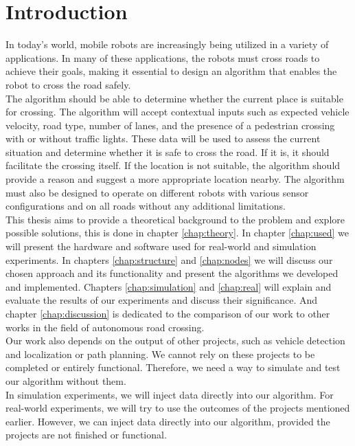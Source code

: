 \chapter*{Introduction}
    In today's world, mobile robots are increasingly being utilized in a variety of applications. In many of these applications, the robots must cross roads to achieve their goals, making it essential to design an algorithm that enables the robot to cross the road safely.\\
    The algorithm should be able to determine whether the current place is suitable for crossing. The algorithm will accept contextual inputs such as expected vehicle velocity, road type, number of lanes, and the presence of a pedestrian crossing with or without traffic lights. These data will be used to assess the current situation and determine whether it is safe to cross the road. If it is, it should facilitate the crossing itself. If the location is not suitable, the algorithm should provide a reason and suggest a more appropriate location nearby. The algorithm must also be designed to operate on different robots with various sensor configurations and on all roads without any additional limitations.\\
    This thesis aims to provide a theoretical background to the problem and explore possible solutions, this is done in chapter \ref{chap:theory}. In chapter \ref{chap:used} we will present the hardware and software used for real-world and simulation experiments. In chapters \ref{chap:structure} and \ref{chap:nodes} we will discuss our chosen approach and its functionality and present the algorithms we developed and implemented. Chapters \ref{chap:simulation} and \ref{chap:real} will explain and evaluate the results of our experiments and discuss their significance. And chapter \ref{chap:discussion} is dedicated to the comparison of our work to other works in the field of autonomous road crossing.\\
    Our work also depends on the output of other projects, such as vehicle detection and localization or path planning. We cannot rely on these projects to be completed or entirely functional. Therefore, we need a way to simulate and test our algorithm without them.\\
    In simulation experiments, we will inject data directly into our algorithm. For real-world experiments, we will try to use the outcomes of the projects mentioned earlier. However, we can inject data directly into our algorithm, provided the projects are not finished or functional.\\
    \newpage
